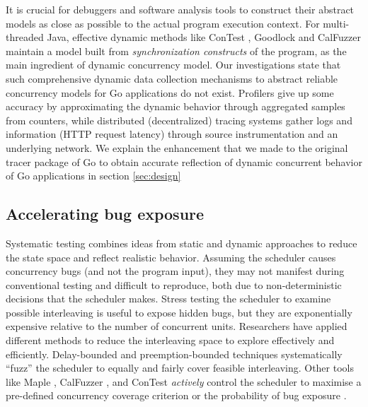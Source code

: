 It is crucial for debuggers and software analysis tools to construct their abstract models as close as possible to the actual program execution context.
%
For multi-threaded Java, effective dynamic methods like ConTest \cite{contest-jgi01}, Goodlock \cite{havelund-goodlock-spin00} and CalFuzzer \cite{joshi-calfuzzer} maintain a model built from \textit{synchronization constructs} of the program, as the main ingredient of dynamic concurrency model.
%
Our investigations state that such comprehensive dynamic data collection mechanisms to abstract reliable concurrency models for Go applications do not exist.
%
Profilers \cite{go-profile-blog} give up some accuracy by approximating the dynamic behavior through aggregated samples from counters,
%
while distributed (decentralized) tracing systems \cite{dapper} gather logs and information (\eg HTTP request latency) through source instrumentation and an underlying network.
%
We explain the enhancement that we made to the original tracer package of Go to obtain accurate reflection of dynamic concurrent behavior of Go applications in section \ref{sec:design}
%


\subsection{Accelerating bug exposure}



Systematic testing combines ideas from static and dynamic approaches to reduce the state space and reflect realistic behavior.
%
Assuming the scheduler causes concurrency bugs (and not the program input), they may not manifest during conventional testing and difficult to reproduce, both due to non-deterministic decisions that the scheduler makes.
%
Stress testing the scheduler to examine possible interleaving is useful to expose hidden bugs, but they are exponentially expensive relative to the number of concurrent units.
%
Researchers have applied different methods \cite{thomson-concurrencyTesting-ppopp14} to reduce the interleaving space to explore effectively and efficiently.
%
Delay-bounded \cite{emmi-delayBounded-popl11,burckhardt-depthBug-asplos10} and preemption-bounded \cite{madanlal-preemptionBound-pldi07} techniques systematically ``fuzz'' the scheduler to equally and fairly cover feasible interleaving.
%
Other tools like Maple \cite{yu-maple-oopsla12}, CalFuzzer \cite{joshi-calfuzzer},  and ConTest \cite{contest-jgi01,edelstein2003contest} \textit{actively} control the scheduler to maximise a pre-defined concurrency coverage criterion \cite{hong-syncTesting-issta12} or the probability of bug exposure \cite{burckhardt-depthBug-asplos10}.

